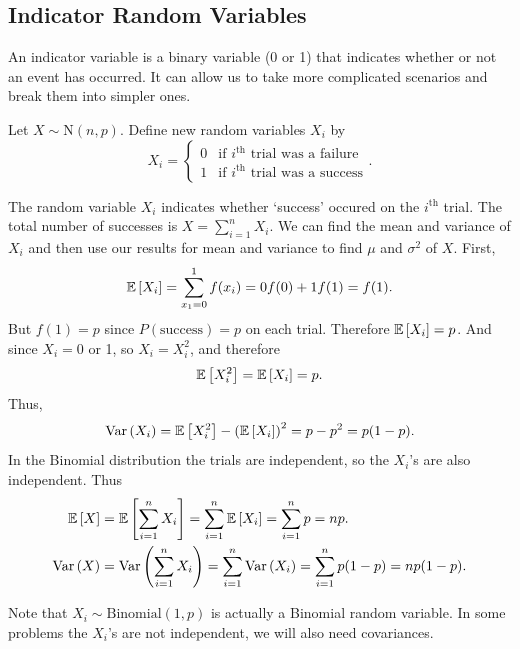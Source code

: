\subsection{Indicator Random Variables}

An indicator variable is a binary variable (0 or 1) that indicates whether or not an event has occurred. It can allow us to take more complicated scenarios and break them into simpler ones.

\begin{example}
    Let $X \sim \text{N}(n,p)$. Define new random variables $X_i$ by \vspace{-3mm}
    \[
        X_i = 
        \begin{cases} 
            0 & \text{if $i^{\text{th}}$ trial was a failure} \\
            1 & \text{if $i^{\text{th}}$ trial was a success}
        \end{cases}.
    \]

    The random variable $X_i$ indicates whether `success' occured on the $i^\text{th}$ trial. The total number of successes is $X = \displaystyle \sum_{i=1}^{n} X_i$. We can find the mean and variance of $X_i$ and then use our results for mean and variance to find $\mu$ and $\sigma^2$ of $X$. First, \vspace{-3mm}
    \[
        \mathbb{E}\left[{X_i}\right] = \displaystyle \sum_{x_1=0}^{1} f(x_i) = 0f(0) + 1f(1) = f(1). 
    \]
    But $f(1) = p$ since $P(\text{success}) = p$ on each trial. Therefore $\mathbb{E}\left[{X_i}\right] = p$. And since $X_i = 0$ or 1, so $X_i = X_i^2$, and therefore 
    \[
        \mathbb{E}\left[{X_i^2}\right] = \mathbb{E}\left[{X_i}\right] = p.
    \]
    Thus, 
    \[
        \operatorname{Var}\left({X_i}\right) = \mathbb{E}\left[{X_i^2}\right] - \left( \mathbb{E}\left[{X_i}\right] \right)^2 = p - p^2 = p(1-p).
    \]
    In the Binomial distribution the trials are independent, so the $X_i$'s are also independent. Thus
    \begin{align*}
        \mathbb{E}\left[{X}\right] &= \mathbb{E}\left[{\displaystyle \sum_{i=1}^{n} X_i}\right] = \displaystyle \sum_{i=1}^{n} \mathbb{E}\left[{X_i}\right] = \displaystyle \sum_{i=1}^{n} p = np. \\
        \operatorname{Var}\left({X}\right) &= \operatorname{Var}\left({\displaystyle \sum_{i=1}^{n} X_i}\right) = \displaystyle \sum_{i=1}^{n} \operatorname{Var}\left({X_i}\right) = \displaystyle \sum_{i=1}^{n} p(1-p) = np(1-p).
    \end{align*}
\end{example}

\begin{remark}
    Note that $X_i \sim \text{Binomial}(1,p)$ is actually a Binomial random variable. In some problems the $X_i$'s are not independent, we will also need covariances.
\end{remark}


